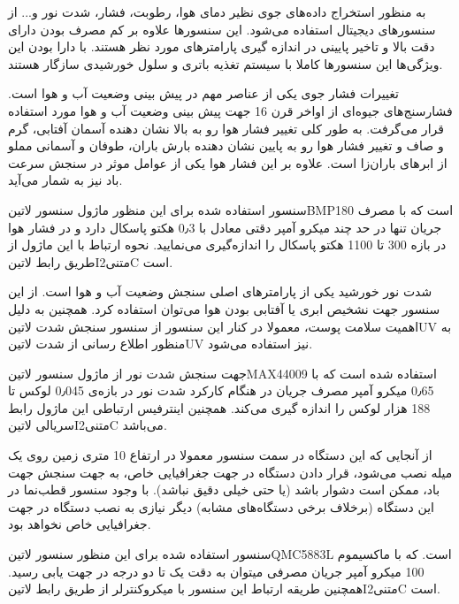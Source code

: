 
به منظور استخراج داده‌های جوی نظیر دمای هوا، رطوبت، فشار، شدت نور و... از سنسورهای دیجیتال استفاده می‌شود. این سنسورها علاوه بر کم مصرف بودن دارای دقت بالا و تاخیر پایینی در اندازه گیری پارامتر‌های مورد نظر هستند. با دارا بودن این ویژگی‌ها این سنسور‌ها کاملا با سیستم تغذیه باتری و سلول خورشیدی سازگار هستند.


تغییرات فشار جوی یکی از عناصر مهم در پیش بینی وضعیت آب و هوا است. فشارسنج‌های جیوه‌ای از اواخر قرن 16 جهت پیش بینی وضعیت آب و هوا مورد استفاده قرار می‌گرفت. به طور کلی تغییر فشار هوا رو به بالا نشان دهنده آسمان آفتابی، گرم و صاف و تغییر فشار هوا رو به پایین نشان دهنده بارش باران، طوفان و آسمانی مملو از ابر‌های باران‌زا است. علاوه بر این فشار هوا یکی از عوامل موثر در سنجش سرعت باد نیز به شمار می‌آید. 

سنسور استفاده شده برای این منظور ماژول سنسور ‌لاتین{BMP180} است که با مصرف جریان تنها در حد چند میکرو آمپر دقتی معادل با 0٫3 هکتو پاسکال دارد و در فشار هوا در بازه 300 تا 1100 هکتو پاسکال را اندازه‌گیری می‌نمایید. نحوه ارتباط با این ماژول از طریق رابط ‌لاتین{I‌متنی{2}C} است. 


شدت نور خورشید یکی از پارامتر‌های اصلی سنجش وضعیت آب و هوا است. از این سنسور جهت نشخیص ابری یا آفتابی بودن هوا می‌توان استفاده کرد. همچنین به دلیل اهمیت سلامت پوست، معمولا در کنار این سنسور از سنسور سنجش شدت ‌لاتین{UV} به منظور اطلاع رسانی از شدت ‌لاتین{UV} نیز استفاده می‌شود. 

جهت سنجش شدت نور از ماژول سنسور ‌لاتین{MAX44009} استفاده شده است که با 0٫65 میکرو آمپر مصرف جریان در هنگام کارکرد شدت نور در بازه‌ی 0٫045 لوکس تا 188 هزار لوکس را اندازه گیری می‌کند. همچنین اینترفیس ارتباطی این ماژول رابط سریالی ‌لاتین{I‌متنی{2}C} می‌باشد.


از آنجایی که این دستگاه در سمت سنسور معمولا در ارتفاع 10 متری زمین روی یک میله نصب می‌شود، قرار دادن دستگاه در جهت جغرافیایی خاص، به جهت سنجش جهت باد، ممکن است دشوار باشد (یا حتی خیلی دقیق نباشد). با وجود سنسور قطب‌نما در این دستگاه (برخلاف برخی دستگاه‌های مشابه) دیگر نیازی به نصب دستگاه در جهت جغرافیایی خاص نخواهد بود.

سنسور استفاده شده برای این منظور سنسور ‌لاتین{QMC5883L} است. که با ماکسیموم 100 میکرو آمپر جریان مصرفی میتوان به دقت یک تا دو درجه در جهت یابی رسید. همچنین طریقه ارتباط این سنسور با میکروکنترلر از طریق رابط ‌لاتین{I‌متنی{2}C} است.

